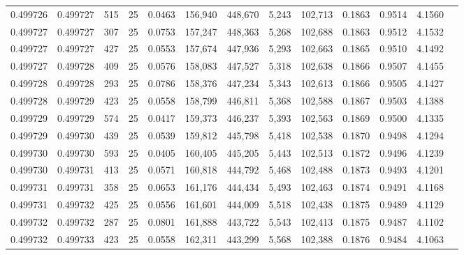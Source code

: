 \begin{tabular}{rrrrrrrrrrrrr}
0.499726 & 0.499727 &   515 &  25 &                                     0.0463 & 156,940 & 448,670 &   5,243 & 102,713 & 0.1863 & 0.9514 & 4.1560 \\
0.499727 & 0.499727 &   307 &  25 &                                     0.0753 & 157,247 & 448,363 &   5,268 & 102,688 & 0.1863 & 0.9512 & 4.1532 \\
0.499727 & 0.499727 &   427 &  25 &                                     0.0553 & 157,674 & 447,936 &   5,293 & 102,663 & 0.1865 & 0.9510 & 4.1492 \\
0.499727 & 0.499728 &   409 &  25 &                                     0.0576 & 158,083 & 447,527 &   5,318 & 102,638 & 0.1866 & 0.9507 & 4.1455 \\
0.499728 & 0.499728 &   293 &  25 &                                     0.0786 & 158,376 & 447,234 &   5,343 & 102,613 & 0.1866 & 0.9505 & 4.1427 \\
0.499728 & 0.499729 &   423 &  25 &                                     0.0558 & 158,799 & 446,811 &   5,368 & 102,588 & 0.1867 & 0.9503 & 4.1388 \\
0.499729 & 0.499729 &   574 &  25 &                                     0.0417 & 159,373 & 446,237 &   5,393 & 102,563 & 0.1869 & 0.9500 & 4.1335 \\
0.499729 & 0.499730 &   439 &  25 &                                     0.0539 & 159,812 & 445,798 &   5,418 & 102,538 & 0.1870 & 0.9498 & 4.1294 \\
0.499730 & 0.499730 &   593 &  25 &                                     0.0405 & 160,405 & 445,205 &   5,443 & 102,513 & 0.1872 & 0.9496 & 4.1239 \\
0.499730 & 0.499731 &   413 &  25 &                                     0.0571 & 160,818 & 444,792 &   5,468 & 102,488 & 0.1873 & 0.9493 & 4.1201 \\
0.499731 & 0.499731 &   358 &  25 &                                     0.0653 & 161,176 & 444,434 &   5,493 & 102,463 & 0.1874 & 0.9491 & 4.1168 \\
0.499731 & 0.499732 &   425 &  25 &                                     0.0556 & 161,601 & 444,009 &   5,518 & 102,438 & 0.1875 & 0.9489 & 4.1129 \\
0.499732 & 0.499732 &   287 &  25 &                                     0.0801 & 161,888 & 443,722 &   5,543 & 102,413 & 0.1875 & 0.9487 & 4.1102 \\
0.499732 & 0.499733 &   423 &  25 &                                     0.0558 & 162,311 & 443,299 &   5,568 & 102,388 & 0.1876 & 0.9484 & 4.1063 \\

\end{tabular}
